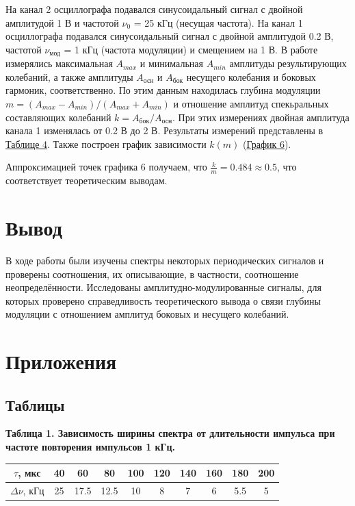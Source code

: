\documentclass[15pt,a5paper,reqno]{article}
\begin{document}
        На канал 2 осциллографа подавался синусоидальный сигнал с двойной амплитудой 1 В и частотой $\nu_0$ = 25 кГц (несущая частота). На канал 1 осциллографа подавался синусоидальный сигнал с двойной амплитудой 0.2 В, частотой $\nu_{\text{мод}}$ = 1 кГц (частота модуляции) и смещением на 1 В. В работе измерялись максимальная $A_{max}$ и минимальная $A_{min}$ амплитуды результирующих колебаний, а также амплитуды $A_{\text{осн}}$ и $A_{\text{бок}}$ несущего колебания и боковых гармоник, соответственно. По этим данным находилась глубина модуляции $m = (A_{max} - A_{min})/(A_{max} + A_{min})$ и отношение амплитуд спекьральных составляющих колебаний $k = A_{\text{бок}}/A_{\text{осн}}$. При этих измерениях двойная амплитуда канала 1 изменялась от 0.2 В до 2 В. Результаты измерений представлены в \hyperlink{table_4}{Таблице 4}. Также построен график зависимости $k(m)$ (\hyperlink{graph_6}{График 6}).

        Аппроксимацией точек графика 6 получаем, что $\frac{k}{m} = 0.484 \approx 0.5$, что соответствует теоретическим выводам.
    
\section{Вывод}

    В ходе работы были изучены спектры некоторых периодических сигналов и проверены соотношения, их описывающие, в частности, соотношение неопределённости. Исследованы амплитудно-модулированные сигналы, для которых проверено справедливость теоретического вывода о связи глубины модуляции с отношением амплитуд боковых и несущего колебаний.
    
\newpage
\section{Приложения}

    \subsection{Таблицы}

        \noindent\hypertarget{table_1}{\textbf{Таблица 1. Зависимость ширины спектра от длительности импульса при частоте повторения импульсов 1 кГц.}}
        \begin{center}
            \begin{tabular}{|c|c|c|c|c|c|c|c|c|c|}
                \hline
                $\tau$, мкс      & 40 & 60   & 80   & 100 & 120 & 140 & 160 & 180 & 200 \\ \hline
                $\Delta\nu$, кГц & 25 & 17.5 & 12.5 & 10  & 8   &   7 &   6 & 5.5 & 5   \\ \hline
            \end{tabular}
        \end{center}
\end{document}
